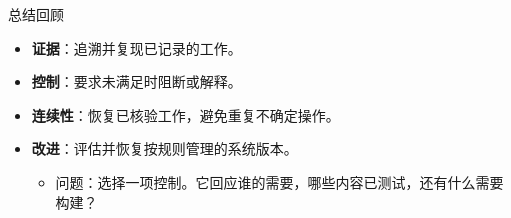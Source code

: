\begin{frame}{总结回顾\handsup}
\begin{itemize}
\item \textbf{证据}：追溯并复现已记录的工作。
\item \textbf{控制}：要求未满足时阻断或解释。
\item \textbf{连续性}：恢复已核验工作，避免重复不确定操作。
\item \textbf{改进}：评估并恢复按规则管理的系统版本。
\begin{itemize}
\item 问题：选择一项控制。它回应谁的需要，哪些内容已测试，还有什么需要构建？
\end{itemize}
\end{itemize}
\end{frame}
